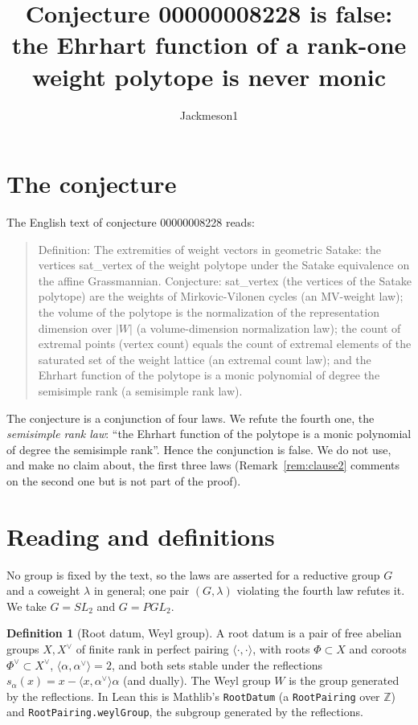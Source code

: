 \documentclass[11pt]{article}
\title{Conjecture 00000008228 is false:\\ the Ehrhart function of a rank-one weight polytope is never monic}
\author{Jackmeson1}
\date{}
\theoremstyle{remark}
\theoremstyle{definition}
\newtheorem{definition}[theorem]{Definition}
\begin{document}
\maketitle

\section{The conjecture}

The English text of conjecture 00000008228 reads:

\begin{quote}
Definition: The extremities of weight vectors in geometric Satake: the vertices sat\_vertex of the
weight polytope under the Satake equivalence on the affine Grassmannian. Conjecture: sat\_vertex (the
vertices of the Satake polytope) are the weights of Mirkovic-Vilonen cycles (an MV-weight law); the
volume of the polytope is the normalization of the representation dimension over $|W|$ (a
volume-dimension normalization law); the count of extremal points (vertex count) equals the count of
extremal elements of the saturated set of the weight lattice (an extremal count law); and the
Ehrhart function of the polytope is a monic polynomial of degree the semisimple rank (a semisimple
rank law).
\end{quote}

The conjecture is a conjunction of four laws. We refute the fourth one, the \emph{semisimple rank
law}: ``the Ehrhart function of the polytope is a monic polynomial of degree the semisimple rank''.
Hence the conjunction is false. We do not use, and make no claim about, the first three laws
(Remark~\ref{rem:clause2} comments on the second one but is not part of the proof).

\section{Reading and definitions}

No group is fixed by the text, so the laws are asserted for a reductive group $G$ and a coweight
$\lambda$ in general; one pair $(G,\lambda)$ violating the fourth law refutes it. We take $G = SL_2$
and $G = PGL_2$.

\begin{definition}[Root datum, Weyl group]
A root datum is a pair of free abelian groups $X, X^\vee$ of finite rank in perfect pairing
$\langle\cdot,\cdot\rangle$, with roots $\Phi\subset X$ and coroots $\Phi^\vee\subset X^\vee$,
$\langle\alpha,\alpha^\vee\rangle = 2$, and both sets stable under the reflections
$s_\alpha(x) = x - \langle x,\alpha^\vee\rangle\alpha$ (and dually). The Weyl group $W$ is the group
generated by the reflections. In Lean this is Mathlib's \texttt{RootDatum} (a \texttt{RootPairing}
over $\mathbb{Z}$) and \texttt{RootPairing.weylGroup}, the subgroup generated by the reflections.
\end{definition}
\end{document}
